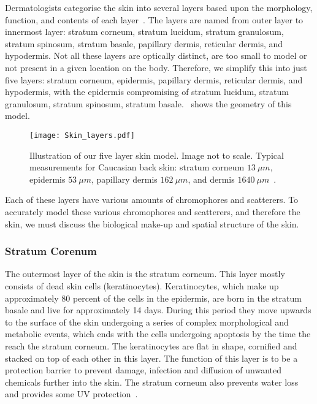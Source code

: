 Dermatologists categorise the skin into several layers based upon the morphology, function, and contents of each layer~\cite{freedberg1999fitzpatrick,zaidi2010dermatology}.
The layers are named from outer layer to innermost layer: stratum corneum, stratum lucidum, stratum granulosum, stratum spinosum, stratum basale, papillary dermis, reticular dermis, and hypodermis.
Not all these layers are optically distinct, are too small to model or not present in a given location on the body.
Therefore, we simplify this into just five layers: stratum corneum, epidermis, papillary dermis, reticular dermis, and hypodermis, with the epidermis compromising of stratum lucidum, stratum granulosum, stratum spinosum, stratum basale.~ shows the geometry of this model.

\begin{figure}[!htpb]
    \centering
    \texttt{[image: Skin\_layers.pdf]}
    \caption{Illustration of our five layer skin model. Image not to scale. Typical measurements for Caucasian back skin: stratum corneum $13~\mu m$, epidermis $53~\mu m$, papillary dermis $162~\mu m$, and dermis $1640~\mu m$~\cite{southwood1955thickness}.}
    \label{fig:skinexample}
\end{figure}

Each of these layers have various amounts of chromophores and scatterers.
To accurately model these various chromophores and scatterers, and therefore the skin, we must discuss the biological make-up and spatial structure of the skin.

\subsubsection*{Stratum Corenum} %
\label{sub:stratum}

The outermost layer of the skin is the stratum corneum.
This layer mostly consists of dead skin cells (keratinocytes).
Keratinocytes, which make up approximately 80 percent of the cells in the epidermis, are born in the stratum basale and live for approximately 14 days.
During this period they move upwards to the surface of the skin undergoing a series of complex morphological and metabolic events, which ends with the cells undergoing apoptosis by the time the reach the stratum corneum.
The keratinocytes are flat in shape, cornified and stacked on top of each other in this layer.
The function of this layer is to be a protection barrier to prevent damage, infection and diffusion of unwanted chemicals further into the skin.
The stratum corneum also prevents water loss and provides some UV protection~\cite{freedberg1999fitzpatrick,zaidi2010dermatology}.

